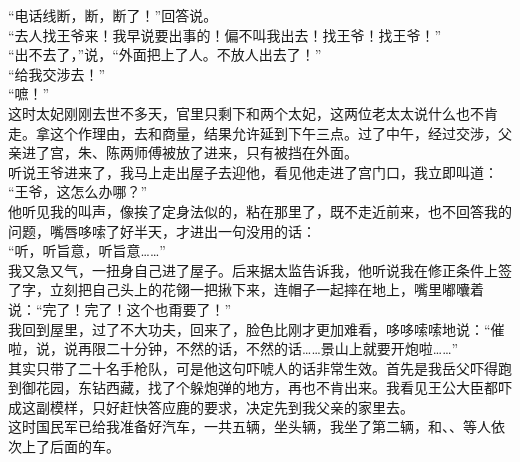 “电话线断，断，断了！”回答说。\\

“去人找王爷来！我早说要出事的！偏不叫我出去！找王爷！找王爷！”\\

“出不去了，”说，“外面把上了人。不放人出去了！”\\

“给我交涉去！”\\

“嗻！”\\

这时太妃刚刚去世不多天，官里只剩下和两个太妃，这两位老太太说什么也不肯走。拿这个作理由，去和商量，结果允许延到下午三点。过了中午，经过交涉，父亲进了宫，朱、陈两师傅被放了进来，只有被挡在外面。\\

听说王爷进来了，我马上走出屋子去迎他，看见他走进了宫门口，我立即叫道：\\

“王爷，这怎么办哪？”\\

他听见我的叫声，像挨了定身法似的，粘在那里了，既不走近前来，也不回答我的问题，嘴唇哆嗦了好半天，才进出一句没用的话：\\

“听，听旨意，听旨意……”\\

我又急又气，一扭身自己进了屋子。后来据太监告诉我，他听说我在修正条件上签了字，立刻把自己头上的花翎一把揪下来，连帽子一起摔在地上，嘴里嘟囔着说：“完了！完了！这个也甭要了！”\\

我回到屋里，过了不大功夫，回来了，脸色比刚才更加难看，哆哆嗦嗦地说：“催啦，说，说再限二十分钟，不然的话，不然的话……景山上就要开炮啦……”\\

其实只带了二十名手枪队，可是他这句吓唬人的话非常生效。首先是我岳父吓得跑到御花园，东钻西藏，找了个躲炮弹的地方，再也不肯出来。我看见王公大臣都吓成这副模样，只好赶快答应鹿的要求，决定先到我父亲的家里去。\\

这时国民军已给我准备好汽车，一共五辆，坐头辆，我坐了第二辆，和、、等人依次上了后面的车。\\

